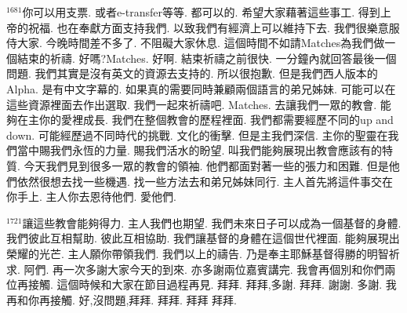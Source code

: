 \documentclass{book}
\begin{document}
$^{1681}$你可以用支票.
或者e-transfer等等.
都可以的.
希望大家藉著這些事工.
得到上帝的祝福.
也在奉獻方面支持我們.
以致我們有經濟上可以維持下去.
我們很樂意服侍大家.
今晚時間差不多了.
不阻礙大家休息.
這個時間不如請Matches為我們做一個結束的祈禱.
好嗎?Matches.
好啊.
結束祈禱之前很快.
一分鐘內就回答最後一個問題.
我們其實是沒有英文的資源去支持的.
所以很抱歉.
但是我們西人版本的Alpha.
是有中文字幕的.
如果真的需要同時兼顧兩個語言的弟兄姊妹.
可能可以在這些資源裡面去作出選取.
我們一起來祈禱吧.
Matches.
去讓我們一眾的教會.
能夠在主你的愛裡成長.
我們在整個教會的歷程裡面.
我們都需要經歷不同的up and down.
可能經歷過不同時代的挑戰.
文化的衝擊.
但是主我們深信.
主你的聖靈在我們當中賜我們永恆的力量.
賜我們活水的盼望.
叫我們能夠展現出教會應該有的特質.
今天我們見到很多一眾的教會的領袖.
他們都面對著一些的張力和困難.
但是他們依然很想去找一些機遇.
找一些方法去和弟兄姊妹同行.
主人首先將這件事交在你手上.
主人你去恩待他們.
愛他們.

$^{1721}$讓這些教會能夠得力.
主人我們也期望.
我們未來日子可以成為一個基督的身體.
我們彼此互相幫助.
彼此互相協助.
我們讓基督的身體在這個世代裡面.
能夠展現出榮耀的光芒.
主人願你帶領我們.
我們以上的禱告.
乃是奉主耶穌基督得勝的明智祈求.
阿們.
再一次多謝大家今天的到來.
亦多謝兩位嘉賓講完.
我會再個別和你們兩位再接觸.
這個時候和大家在節目過程再見.
拜拜.
拜拜,多謝.
拜拜.
謝謝.
多謝.
我再和你再接觸.
好,沒問題,拜拜.
拜拜.
拜拜 拜拜.
\newpage

\allsectionsfont{\centering}

\setlength\parindent{0pt}
\setlength{\columnsep}{1.25em}
\setlength{\parfillskip}{0pt}
\setlength{\tabcolsep}{1em}
\raggedbottom



\newfontfamily{}
\newfontfamily{}
\newfontfamily{}
\newfontfamily{}
\newfontfamily{}
\newcommand{\chfont}[1]{\centerfont{\huge\textcolor{hcolor}{#1}}}
\newcommand{\leftcitation}[1]{\leftcitationfont{\Large\textcolor{hcolor}{#1}}}
\newcommand{\rightcitation}[1]{\rightcitationfont{\normalsize\textcolor{rcolor}{#1}}}
\newfontfamily{}
\end{document}
